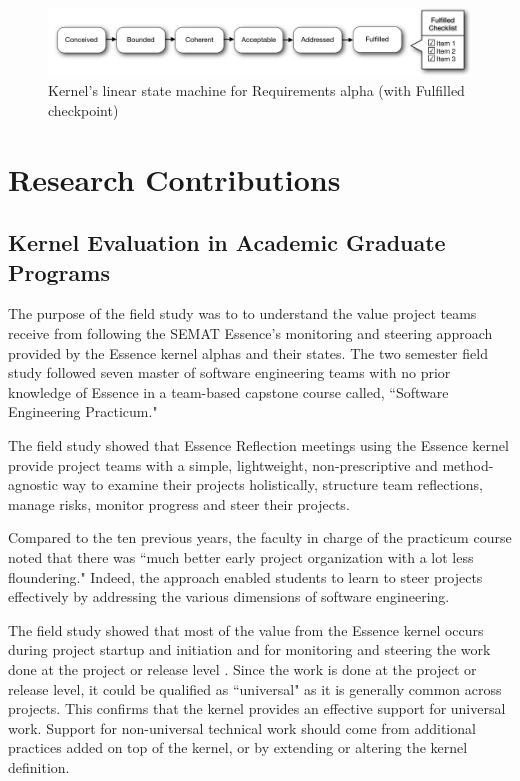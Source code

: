 \documentclass[preprint,12pt,3p]{elsarticle}
\begin{document}
\begin{figure}[h]\vspace*{4pt}
\centerline{\includegraphics[width=5.4in]{kernel_images/StateMachineRequirements}}
\caption{Kernel's linear state machine for Requirements alpha (with Fulfilled checkpoint)}\vspace*{-6pt}\label{StateMachine}
\end{figure}

\section{Research Contributions}

\subsection{Kernel Evaluation in Academic Graduate Programs}
\label{CMUFieldStudy}
The purpose of the field study \cite{ICSE2014} was to to understand the value project teams receive from following the SEMAT Essence’s monitoring and steering approach provided by the Essence kernel alphas and their states.  The two semester field study followed seven master of software engineering teams with no prior knowledge of Essence in a team-based capstone course called, ``Software Engineering Practicum." 

The field study showed that Essence Reflection meetings using the Essence kernel provide project teams with a simple, lightweight, non-prescriptive and method-agnostic way to examine their projects holistically, structure team reflections, manage risks, monitor progress and steer their projects. 

Compared to the ten previous years, the faculty in charge of the practicum course noted that there was ``much better early project organization with a lot less floundering." Indeed, the approach enabled students to learn to steer projects effectively by addressing the various dimensions of software engineering.

The field study showed that most of the value from the Essence kernel occurs during project startup and initiation and for monitoring and steering the work done at the project or release level \cite{ICSE2014}. Since the work is done at the project or release level, it could be qualified as ``universal" as it is generally common across projects. This confirms that the kernel provides an effective support for universal work. Support for non-universal technical work should come from additional practices added on top of the kernel, or by extending or altering the kernel definition.
\end{document}
